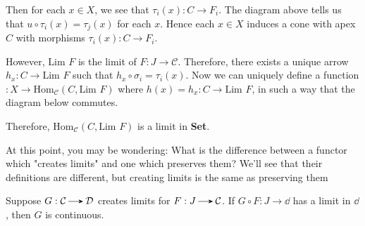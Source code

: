 \begin{prf}
        Then for each $x \in X$, 
        we see that $\tau_i(x) : C \to F_i$.
        The diagram above tells us that $u \circ \tau_i(x) = \tau_j(x)$ for each $x$.
        Hence each $x \in X$ induces a 
        cone with apex $C$ with morphisms $\tau_i(x): C \to F_i$. 
        \begin{center}
        \end{center}
        However, $\text{Lim } F$ is the limit of $F: J \to \mathcal{C}$. Therefore, there 
        exists a unique arrow $h_x: C \to \text{Lim } F$ such that 
        $h_x \circ \sigma_i = \tau_i(x)$. Now we can uniquely
        define a function $: X \to \text{Hom}_{\mathcal{C}}(C, \text{Lim } F)$ where 
        $h(x) = h_x: C \to \text{Lim } F$, in such a way that the diagram below commutes.  
        \begin{center}
        \end{center}
        Therefore, $\text{Hom}_{\mathcal{C}}(C, \text{Lim } F)$ is a limit in \textbf{Set}.
    \end{prf}
    At this point, you may be wondering: What is the difference between 
    a functor which "creates limits" and one which preserves them? 
    We'll see that their definitions are different, but creating limits 
    is the same as preserving them 

    \begin{thm}
        Suppose $G: \cc \to \dd$ creates limits for $F: J \to \cc$. 
        If $G \circ F: J \to \dd$ has a limit in $\dd$, then 
        $G$ is continuous. 
    \end{thm}

